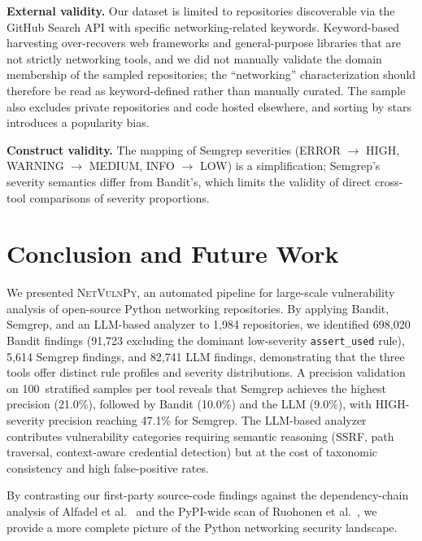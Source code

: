 \documentclass[sigconf,authordraft]{acmart}
\begin{document}
\textbf{External validity.} Our dataset is limited to repositories
discoverable via the GitHub Search API with specific
networking-related keywords. Keyword-based harvesting over-recovers web
frameworks and general-purpose libraries that are not strictly
networking tools, and we did not manually validate the domain
membership of the sampled repositories; the ``networking''
characterization should therefore be read as keyword-defined rather
than manually curated. The sample also excludes private repositories
and code hosted elsewhere, and sorting by stars introduces a
popularity bias.

\textbf{Construct validity.} The mapping of Semgrep severities
(ERROR $\rightarrow$ HIGH, WARNING $\rightarrow$ MEDIUM,
INFO $\rightarrow$ LOW) is a simplification; Semgrep's severity
semantics differ from Bandit's, which limits the validity of direct
cross-tool comparisons of severity proportions.


\section{Conclusion and Future Work}
\label{sec:conclusion}

We presented \textsc{NetVulnPy}, an automated pipeline for
large-scale vulnerability analysis of open-source Python networking
repositories. By applying Bandit, Semgrep, and an LLM-based analyzer
to 1{,}984 repositories, we identified 698{,}020 Bandit findings
(91{,}723 excluding the dominant low-severity \texttt{assert\_used}
rule), 5{,}614 Semgrep findings, and 82{,}741 LLM findings,
demonstrating that the three tools offer distinct rule profiles and
severity distributions. A precision validation on 100~stratified
samples per tool reveals that Semgrep achieves the highest precision
(21.0\%), followed by Bandit (10.0\%) and the LLM (9.0\%), with
HIGH-severity precision reaching 47.1\% for Semgrep. The LLM-based
analyzer contributes vulnerability categories requiring semantic
reasoning (SSRF, path traversal, context-aware credential detection)
but at the cost of taxonomic consistency and high false-positive rates.

By contrasting our first-party source-code findings against the
dependency-chain analysis of Alfadel et al.~\cite{Alfadel2023} and
the PyPI-wide scan of Ruohonen et al.~\cite{Ruohonen2021}, we
provide a more complete picture of the Python networking security
landscape.
\end{document}
